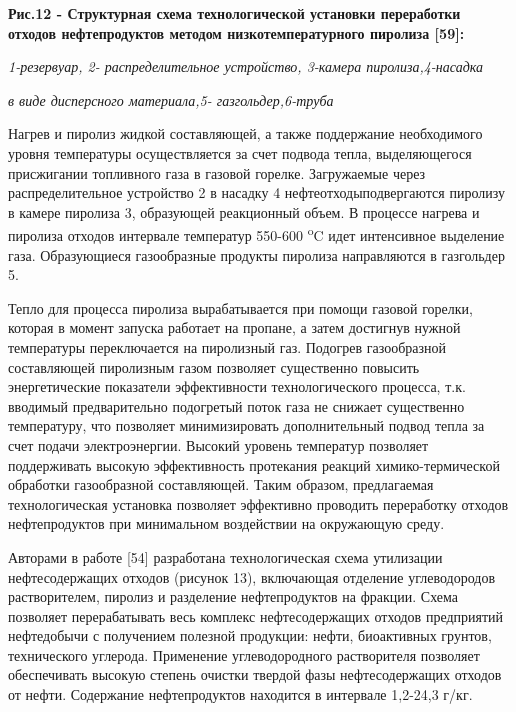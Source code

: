 {\bfseries Рис.12 - Структурная схема технологической установки
переработки отходов нефтепродуктов методом низкотемпературного пиролиза
{[}59{]}:}

\emph{1-резервуар, 2- распределительное устройство, 3-камера
пиролиза,4-насадка}

\emph{в виде дисперсного материала,5- газгольдер,6-труба}

Нагрев и пиролиз жидкой составляющей, а также поддержание необходимого
уровня температуры осуществляется за счет подвода тепла, выделяющегося
присжигании топливного газа в газовой горелке. Загружаемые через
распределительное устройство 2 в насадку 4 нефтеотходыподвергаются
пиролизу в камере пиролиза 3, образующей реакционный объем. В процессе
нагрева и пиролиза отходов интервале температур 550-600
\textsuperscript{o}C идет интенсивное выделение газа. Образующиеся
газообразные продукты пиролиза направляются в газгольдер 5.

Тепло для процесса пиролиза вырабатывается при помощи газовой горелки,
которая в момент запуска работает на пропане, а затем достигнув нужной
температуры переключается на пиролизный газ. Подогрев газообразной
составляющей пиролизным газом позволяет существенно повысить
энергетические показатели эффективности технологического процесса, т.к.
вводимый предварительно подогретый поток газа не снижает существенно
температуру, что позволяет минимизировать дополнительный подвод тепла за
счет подачи электроэнергии. Высокий уровень температур позволяет
поддерживать высокую эффективность протекания реакций химико-термической
обработки газообразной составляющей. Таким образом, предлагаемая
технологическая установка позволяет эффективно проводить переработку
отходов нефтепродуктов при минимальном воздействии на окружающую среду.

Авторами в работе {[}54{]} разработана технологическая схема утилизации
нефтесодержащих отходов (рисунок 13), включающая отделение углеводородов
растворителем, пиролиз и разделение нефтепродуктов на фракции. Схема
позволяет перерабатывать весь комплекс нефтесодержащих отходов
предприятий нефтедобычи с получением полезной продукции: нефти,
биоактивных грунтов, технического углерода. Применение углеводородного
растворителя позволяет обеспечивать высокую степень очистки твердой фазы
нефтесодержащих отходов от нефти. Содержание нефтепродуктов находится в
интервале 1,2-24,3 г/кг.


